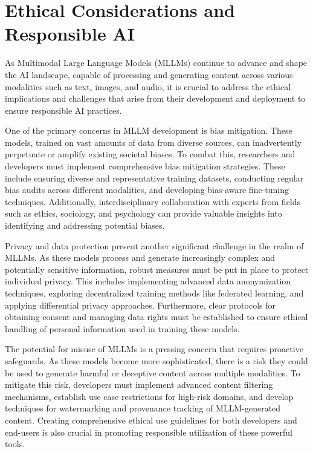 


\chapter{Ethical Considerations and Responsible AI}

As Multimodal Large Language Models (MLLMs) continue to advance and shape the AI landscape, capable of processing and generating content across various modalities such as text, images, and audio, it is crucial to address the ethical implications and challenges that arise from their development and deployment to ensure responsible AI practices\cite{konidena2024ethical}. 


One of the primary concerns in MLLM development is bias mitigation. These models, trained on vast amounts of data from diverse sources, can inadvertently perpetuate or amplify existing societal biases\cite{peng2024securing}. To combat this, researchers and developers must implement comprehensive bias mitigation strategies\cite{zhang2023mitigating}. These include ensuring diverse and representative training datasets, conducting regular bias\cite{boix2022machine} audits across different modalities\cite{pymetrics2022audit}, and developing bias-aware fine-tuning techniques\cite{kim2024domain}. Additionally, interdisciplinary collaboration with experts from fields such as ethics, sociology, and psychology can provide valuable insights into identifying and addressing potential biases\cite{aquino2023practical}.

Privacy and data protection present another significant challenge in the realm of MLLMs. As these models process and generate increasingly complex and potentially sensitive information, robust measures must be put in place to protect individual privacy\cite{he2024emerged, friha2024llm}. This includes implementing advanced data anonymization techniques, exploring decentralized training methods like federated learning, and applying differential privacy approaches. Furthermore, clear protocols for obtaining consent and managing data rights must be established to ensure ethical handling of personal information used in training these models\cite{mccoy2023ethical}.

The potential for misuse of MLLMs is a pressing concern that requires proactive safeguards. As these models become more sophisticated, there is a risk they could be used to generate harmful or deceptive content across multiple modalities\cite{chen2024trustworthy}. To mitigate this risk, developers must implement advanced content filtering mechanisms, establish use case restrictions for high-risk domains, and develop techniques for watermarking and provenance tracking of MLLM-generated content. Creating comprehensive ethical use guidelines for both developers and end-users is also crucial in promoting responsible utilization of these powerful tools.

